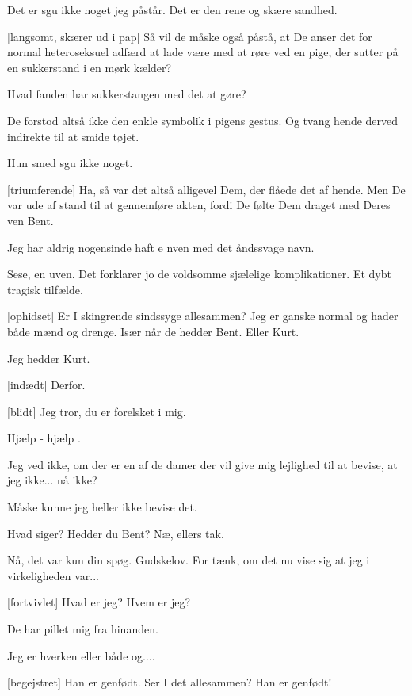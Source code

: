 \documentclass[a4paper,11pt]{article}
\begin{document}
\begin{sketch}
 Det er sgu ikke noget jeg påstår.  Det er den rene og skære sandhed.

[langsomt, skærer ud i pap] Så vil de måske også påstå, at De
anser det for normal heteroseksuel adfærd at lade være med at røre ved
en pige, der sutter på en sukkerstand i en mørk kælder?

 Hvad fanden har sukkerstangen med det at gøre?

 De forstod altså ikke den enkle symbolik i pigens gestus.  Og
tvang hende derved indirekte til at smide tøjet.

 Hun smed sgu ikke noget.

[triumferende] Ha, så var det altså alligevel Dem, der flåede
det af hende.  Men De var ude af stand til at gennemføre akten, fordi
De følte Dem draget med Deres ven Bent.

 Jeg har aldrig nogensinde haft e nven med det åndssvage navn.

 Sese, en uven.  Det forklarer jo de voldsomme sjælelige komplikationer.  Et dybt tragisk tilfælde.


[ophidset] Er I skingrende sindssyge allesammen?  Jeg er ganske normal og hader både mænd og drenge.  Især når de hedder Bent.  Eller Kurt.

 Jeg hedder Kurt.

[indædt] Derfor.

[blidt] Jeg tror, du er forelsket i mig.

 Hjælp - hjælp .

Jeg ved ikke, om der er en af de damer der vil give mig lejlighed til at bevise, at jeg ikke... nå ikke?

Måske kunne jeg heller ikke bevise det.

Hvad siger?  Hedder du Bent?  Næ, ellers tak.

Nå, det var kun din spøg.  Gudskelov.  For tænk, om det nu vise sig at jeg i virkeligheden var...

[fortvivlet]  Hvad er jeg?  Hvem er jeg?

De har pillet mig fra hinanden.

Jeg er hverken eller både og....

[begejstret] Han er genfødt.  Ser I det allesammen?  Han er
genfødt!

\end{sketch}
\end{document}
